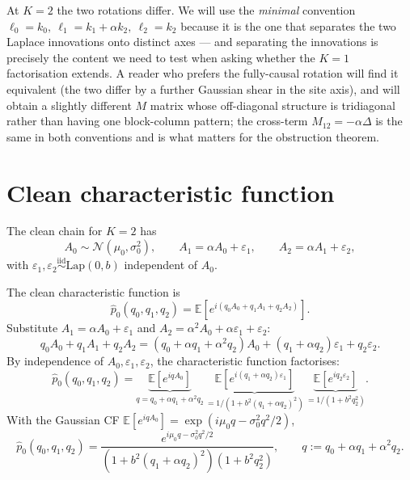\documentclass[11pt,a4paper,openany]{book}
\theoremstyle{plainserif}
\theoremstyle{definition}
\theoremstyle{remarkstyle}
\newcommand{\E}{\mathbb{E}}
\newcommand{\Normal}{\mathcal{N}}
\newcommand{\Lap}{\mathrm{Lap}}
\newcommand{\hatfn}[1]{\widehat{#1}}
\begin{document}
At $K=2$ the two rotations differ. We will use the \emph{minimal}
convention $\ell_0 = k_0,\ \ell_1 = k_1 + \alpha k_2,\ \ell_2 = k_2$
because it is the one that separates the two Laplace innovations onto
distinct axes --- and separating the innovations is precisely the
content we need to test when asking whether the $K=1$ factorisation
extends. A reader who prefers the fully-causal rotation will find it
equivalent (the two differ by a further Gaussian shear in the site axis),
and will obtain a slightly different $M$ matrix whose off-diagonal
structure is tridiagonal rather than having one block-column pattern;
the cross-term $M_{12} = -\alpha\Delta$ is the same in both conventions
and is what matters for the obstruction theorem.

\section{Clean characteristic function}

The clean chain for $K = 2$ has
\begin{equation}
A_0 \sim \Normal(\mu_0, \sigma_0^2),\qquad
A_1 = \alpha A_0 + \varepsilon_1,\qquad
A_2 = \alpha A_1 + \varepsilon_2,
\end{equation}
with $\varepsilon_1, \varepsilon_2 \stackrel{\mathrm{iid}}{\sim} \Lap(0, b)$
independent of $A_0$.

The clean characteristic function is
\begin{equation}
\hatfn p_0(q_0, q_1, q_2) =
\E\!\left[ e^{i(q_0 A_0 + q_1 A_1 + q_2 A_2)}\right].
\end{equation}
Substitute $A_1 = \alpha A_0 + \varepsilon_1$ and
$A_2 = \alpha^2 A_0 + \alpha\varepsilon_1 + \varepsilon_2$:
\begin{equation}
q_0 A_0 + q_1 A_1 + q_2 A_2
 = (q_0 + \alpha q_1 + \alpha^2 q_2) A_0 + (q_1 + \alpha q_2)\varepsilon_1
 + q_2\varepsilon_2.
\end{equation}
By independence of $A_0, \varepsilon_1, \varepsilon_2$, the characteristic
function factorises:
\begin{equation}
\hatfn p_0(q_0, q_1, q_2) =
\underbrace{\E[e^{iq A_0}]}_{q = q_0+\alpha q_1+\alpha^2 q_2}\,
\underbrace{\E[e^{i(q_1+\alpha q_2)\varepsilon_1}]}_{=1/(1+b^2(q_1+\alpha q_2)^2)}\,
\underbrace{\E[e^{iq_2\varepsilon_2}]}_{=1/(1+b^2 q_2^2)}.
\label{eq:K2-clean-cf-pre}
\end{equation}
With the Gaussian CF $\E[e^{iq A_0}] = \exp(i\mu_0 q - \sigma_0^2 q^2/2)$,
\begin{equation}
\boxed{\;
\hatfn p_0(q_0, q_1, q_2)
 = \frac{e^{i\mu_0 q - \sigma_0^2 q^2/2}}
        {(1 + b^2(q_1+\alpha q_2)^2)(1 + b^2 q_2^2)},
 \qquad q := q_0 + \alpha q_1 + \alpha^2 q_2.
\;}
\label{eq:K2-clean-cf}
\end{equation}
\end{document}
